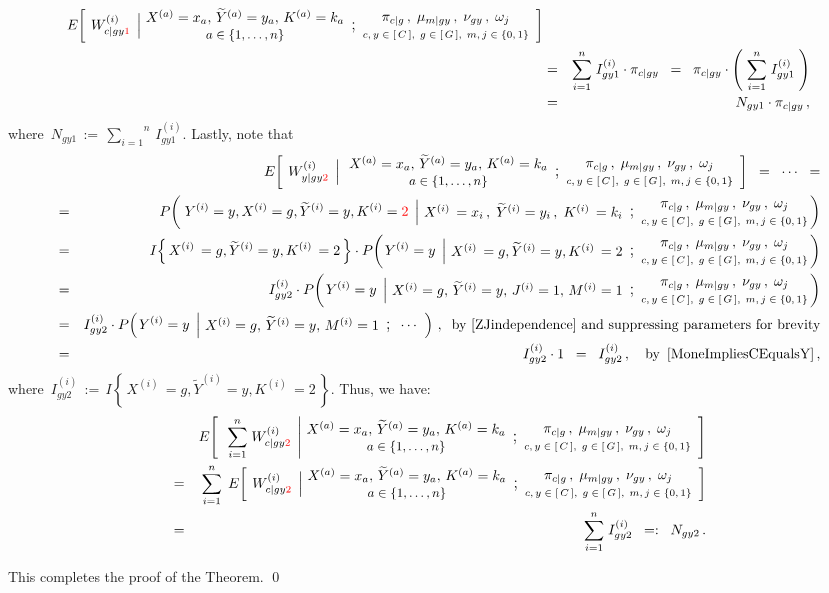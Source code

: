 \begin{enumerate}
\begin{eqnarray*}
		E\!\left[\;
			\left.
			W^{(i)}_{c \vert gy{\color{red}1}}
			\,\;\right\vert
			\!\!
			\begin{array}{c} X^{(a)} = x_{a},\, \widetilde{Y}^{(a)} = y_{a},\, K^{(a)} = k_{a} \\ \textnormal{\small$a\in\{1,\ldots,n\}$} \end{array} \textnormal{\large;} \begin{array}{c} \pi_{c \vert g}\,, \; \mu_{m \vert gy}\,, \; \nu_{gy}\,, \; \omega_{j} \\ \textnormal{\scriptsize$c,y\in[\,C\,], \; g\in[\,G\,], \; m,j\in\{0,1\}$} \end{array}
		\right]
	\\
	&=&
		\overset{n}{\underset{i=1}{\sum}} \;
		I^{(i)}_{gy1} \cdot \pi_{c \vert gy}
	\;\; = \;\; 
		\pi_{c \vert gy}
		\cdot
		\left(\; \overset{n}{\underset{i=1}{\sum}} \; I^{(i)}_{gy1} \;\right)
	\\
	&=&
		N_{gy1} \cdot \pi_{c \vert gy}\,,
	\end{eqnarray*}
	where \,$N_{gy1} \,:=\, \overset{n}{\underset{i=1}{\sum}} \, I^{(i)}_{gy1}$.
	Lastly, note that
	\begin{eqnarray*}
	&&
		E\!\left[\;
			\left.
			W^{(i)}_{y \vert gy{\color{red}2}}
			\,\;\right\vert
			\EMConditionsWithValues
		\right]
		\;\; = \;\; \cdots \;\; =
	\\
	&=&
		P\!\left(\,
			\left.
			Y^{(i)} = y, X^{(i)} = g, \widetilde{Y}^{(i)} = y, K^{(i)} = {\color{red}2}
			\,\;\right\vert
			\!\!
			\ithEMConditionsWithValues
		\!\!\right)
	\\
	&=&
		I\!\left\{\,X^{(i)}\,=g , \widetilde{Y}^{(i)}=y , K^{(i)}\,=2\,\right\}
		\cdot
		P\!\left(
			\left.
			Y^{(i)} = y
			\,\;\right\vert
			\!\!
			\ithGYTwoEMConditionsWithValues
		\!\!\right)
	\\
	&=&
		I^{(i)}_{gy2}
		\cdot
		P\!\left(
			\left.
			Y^{(i)} = y
			\,\;\right\vert
			\!\!
			\begin{array}{c}
				X^{(i)} = g,\, \widetilde{Y}^{(i)} = y,\, J^{(i)} = 1,\, M^{(i)} = 1
			\end{array}
			\textnormal{\large;}
			\modelParameters
		\!\!\right)
	\\
	&=&
		I^{(i)}_{gy2}
		\cdot
		P\!\left(
			\left.
			Y^{(i)} = y
			\,\;\right\vert
			\!\!
			\begin{array}{c}
				X^{(i)} = g,\, \widetilde{Y}^{(i)} = y,\, M^{(i)} = 1
			\end{array}
			\textnormal{\large;}
			\;\;\cdots\;\;
		\right)\,,
		\;\;
		\textnormal{by \eqref{ZJindependence} and suppressing parameters for brevity}
	\\
	&=&
		I^{(i)}_{gy2} \cdot 1
		\;\; = \;\;
		I^{(i)}_{gy2}\,,
		\quad
		\textnormal{by \,\eqref{MoneImpliesCEqualsY}}\,,
	\end{eqnarray*}
	where \,$I^{(i)}_{gy2} \,:=\, I\!\left\{\,X^{(i)}\,=g , \widetilde{Y}^{(i)}=y , K^{(i)}\,=2\,\right\}$.
	Thus, we have:
	\begin{eqnarray*}
	&&
		E\!\left[\;\;
			\left.
			\overset{n}{\underset{i=1}{\sum}} \; W^{(i)}_{c \vert gy{\color{red}2}}
			\,\;\right\vert
			\!\!
			\begin{array}{c} X^{(a)} = x_{a},\, \widetilde{Y}^{(a)} = y_{a},\, K^{(a)} = k_{a} \\ \textnormal{\small$a\in\{1,\ldots,n\}$} \end{array} \textnormal{\large;} \begin{array}{c} \pi_{c \vert g}\,, \; \mu_{m \vert gy}\,, \; \nu_{gy}\,, \; \omega_{j} \\ \textnormal{\scriptsize$c,y\in[\,C\,], \; g\in[\,G\,], \; m,j\in\{0,1\}$} \end{array}
		\right]
	\\
	&=&
		\overset{n}{\underset{i=1}{\sum}} \;\,
		E\!\left[\;
			\left.
			W^{(i)}_{c \vert gy{\color{red}2}}
			\,\;\right\vert
			\!\!
			\begin{array}{c} X^{(a)} = x_{a},\, \widetilde{Y}^{(a)} = y_{a},\, K^{(a)} = k_{a} \\ \textnormal{\small$a\in\{1,\ldots,n\}$} \end{array} \textnormal{\large;} \begin{array}{c} \pi_{c \vert g}\,, \; \mu_{m \vert gy}\,, \; \nu_{gy}\,, \; \omega_{j} \\ \textnormal{\scriptsize$c,y\in[\,C\,], \; g\in[\,G\,], \; m,j\in\{0,1\}$} \end{array}
		\right]
	\\
	&=&
		\overset{n}{\underset{i=1}{\sum}} \;
		I^{(i)}_{gy2}
	\;\; =: \;\; 
		N_{gy2}\,.
	\end{eqnarray*}
\end{enumerate}
This completes the proof of the Theorem. \qed


